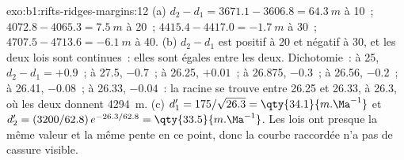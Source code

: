 \begin{solution}{exo:b1:rifts-ridges-margins:12}
(a) $d_2 - d_1 = 3671.1 - 3606.8 = \qty{64.3}{m}$ à \qty{10}{\Ma}~;
$4072.8 - 4065.3 = \qty{7.5}{m}$ à 20~; $4415.4 - 4417.0 = \qty{-1.7}{m}$ à
30~; $4707.5 - 4713.6 = \qty{-6.1}{m}$ à 40. (b) $d_2 - d_1$ est positif à 20
et négatif à 30, et les deux lois sont continues~: elles sont égales entre les deux.
Dichotomie~: à 25, $d_2 - d_1 = +0.9$~; à 27.5, $-0.7$~; à 26.25, $+0.01$~; à
26.875, $-0.3$~; à 26.56, $-0.2$~; à 26.41, $-0.08$~; à 26.33, $-0.04$~: la
racine se trouve entre 26.25 et 26.33, à \qty{26.3}{\Ma}, où les deux donnent
\qty{4294}{m}. (c) $d_1' = 175/\sqrt{26.3} = \qty{34.1}{m.\Ma^{-1}}$ et
$d_2' = (3200/62.8)\,e^{-26.3/62.8} = \qty{33.5}{m.\Ma^{-1}}$. Les lois ont
presque la même valeur et la même pente en ce point, donc la courbe raccordée n'a pas de
cassure visible.
\end{solution}

